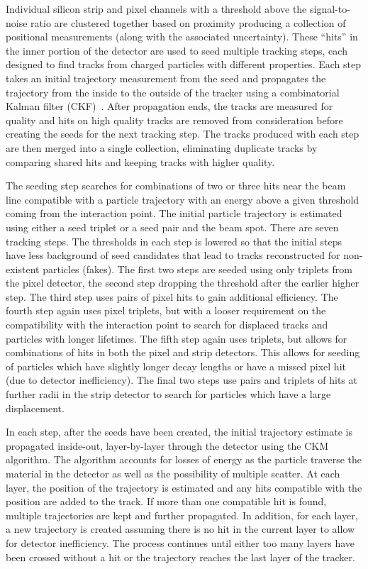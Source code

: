 Individual silicon strip and pixel channels with a threshold above the
signal-to-noise ratio are clustered together based on proximity producing a
collection of positional measurements (along with the associated uncertainty).
These ``hits'' in the inner portion of the detector are used to seed multiple
tracking steps, each designed to find tracks from charged particles with
different properties. Each step takes an initial trajectory measurement
from the seed and propagates the trajectory from the inside to the outside
of the tracker using a combinatorial Kalman filter (CKF)~\cite{ckf}. After
propagation ends, the tracks are measured for quality and hits on high quality
tracks are removed from consideration before creating the seeds for the next
tracking step. The tracks produced with each step are then merged into a single
collection, eliminating duplicate tracks by comparing shared hits and keeping
tracks with higher quality.

The seeding step searches for combinations of two or three hits near the
beam line compatible with a particle trajectory with an energy above a given
threshold coming from the interaction point. The initial particle trajectory
is estimated using either a seed triplet or a seed pair and the beam spot.
There are seven tracking steps. The thresholds in each step is lowered
so that the initial steps have less background of seed candidates that lead
to tracks reconstructed for non-existent particles (fakes). The first two
steps are seeded using only triplets from the pixel detector, the second step
dropping the \pt threshold after the earlier higher \pt step. The third step
uses pairs of pixel hits to gain additional efficiency. The fourth step again
uses pixel triplets, but with a looser requirement on the compatibility with
the interaction point to search for displaced tracks and particles with longer
lifetimes. The fifth step again uses triplets, but allows for combinations
of hits in both the pixel and strip detectors. This allows for seeding of
particles which have slightly longer decay lengths or have a missed pixel hit
(due to detector inefficiency). The final two steps use pairs and triplets of
hits at further radii in the strip detector to search for particles which have
a large displacement.

In each step, after the seeds have been created, the initial trajectory
estimate is propagated inside-out, layer-by-layer through the detector using
the CKM algorithm. The algorithm accounts for losses of energy as the particle
traverse the material in the detector as well as the possibility of multiple
scatter. At each layer, the position of the trajectory is estimated and any
hits compatible with the position are added to the track. If more than one
compatible hit is found, multiple trajectories are kept and further propagated.
In addition, for each layer, a new trajectory is created assuming there is
no hit in the current layer to allow for detector inefficiency. The process
continues until either too many layers have been crossed without a hit or the
trajectory reaches the last layer of the tracker.

